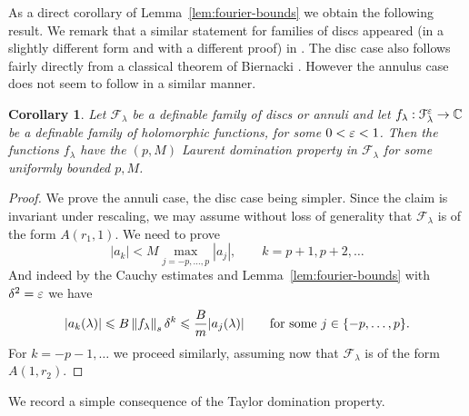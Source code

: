 \documentclass[reqno]{amsart}
\newtheorem{Cor}{Corollary}{\bfseries}{\itshape}
\renewcommand\~[1]{\widetilde{#1}}
\def\cF{{\mathcal F}} \def\cL{{\mathcal L}} \def\cR{{\mathcal R}}
\begin{document}
As a direct corollary of Lemma~\ref{lem:fourier-bounds} we obtain the
following result. We remark that a similar statement for families of
discs appeared (in a slightly different form and with a different
proof) in \cite{cpw:params}. The disc case also follows fairly
directly from a classical theorem of Biernacki
\cite{biernacki}. However the annulus case does not seem to follow in
a similar manner.

\begin{Cor}\label{cor:uniform-indices}
  Let $\cF_\lambda$ be a definable family of discs or annuli and let
  $f_\lambda:\cF_\lambda^\e\to\C$ be a definable family of
  holomorphic functions, for some $0<\varepsilon<1$. Then the functions
  $f_\lambda$ have the $(p,M)$ Laurent domination property in $\cF_\lambda$
  for some uniformly bounded $p,M$.
\end{Cor}
\begin{proof}
  We prove the annuli case, the disc case being simpler. Since the
  claim is invariant under rescaling, we may assume without loss of
  generality that $\cF_\lambda$ is of the form $A(r_1,1)$. We need to
  prove
  \begin{equation}
    |a_k| < M \max_{j=-p,\ldots,p} |a_j| , \qquad k=p+1,p+2,\ldots
  \end{equation}
  And indeed by the Cauchy estimates and
  Lemma~\ref{lem:fourier-bounds} with $\delta^2=\varepsilon$ we have
  \begin{equation}
    |a_k(\lambda)| \leqslant B \left\Vert f_\lambda \right\Vert_s \delta^{k} \leqslant \frac B m |a_j(\lambda)| \qquad \text{for
      some } j\in\{-p,\ldots,p\}.
  \end{equation}
  For $k=-p-1,\ldots$ we proceed similarly, assuming now that
  $\cF_\lambda$ is of the form $A(1,r_2)$.
\end{proof}

We record a simple consequence of the Taylor domination property.
\end{document}
